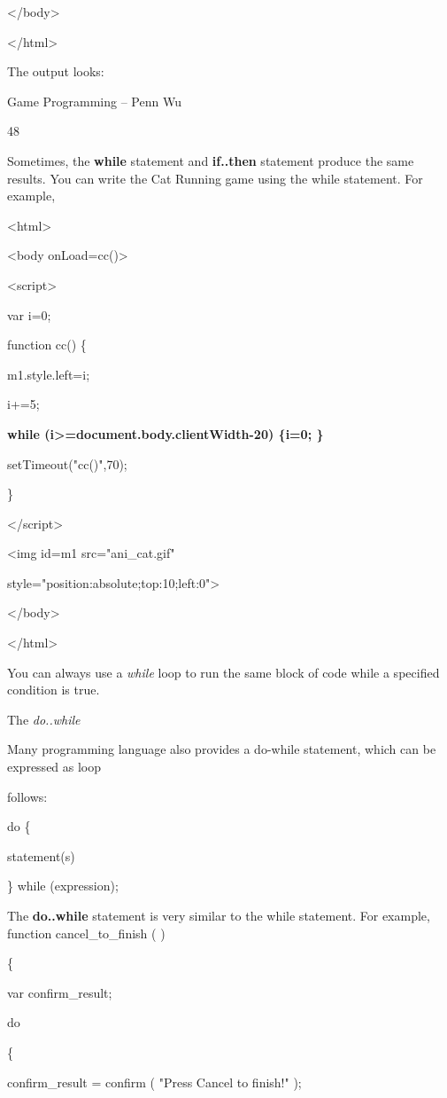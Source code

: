 \documentclass[
]{article}
\begin{document}
\textless/body\textgreater{}

\textless/html\textgreater{}

The output looks:

Game Programming -- Penn Wu

48

\protect\hypertarget{index_split_004.htmlux5cux23p49}{}{}

Sometimes, the \textbf{while} statement and \textbf{if..then} statement
produce the same results. You can write the Cat Running game using the
while statement. For example,

\textless html\textgreater{}

\textless body onLoad=cc()\textgreater{}

\textless script\textgreater{}

var i=0;

function cc() \{

m1.style.left=i;

i+=5;

\textbf{while (i\textgreater=document.body.clientWidth-20) \{i=0; \}}

setTimeout("cc()",70);

\}

\textless/script\textgreater{}

\textless img id=m1 src="ani\_cat.gif"

style="position:absolute;top:10;left:0"\textgreater{}

\textless/body\textgreater{}

\textless/html\textgreater{}

You can always use a \emph{while} loop to run the same block of code
while a specified condition is true.

The \emph{do..while}

Many programming language also provides a do-while statement, which can
be expressed as loop

follows:

do \{

statement(s)

\} while (expression);

The \textbf{do..while} statement is very similar to the while statement.
For example, function cancel\_to\_finish ( )

\{

var confirm\_result;

do

\{

confirm\_result = confirm ( "Press Cancel to finish!" );
\end{document}
